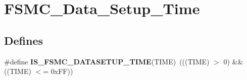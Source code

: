 \hypertarget{group__FSMC__Data__Setup__Time}{
\section{FSMC\_\-Data\_\-Setup\_\-Time}
\label{group__FSMC__Data__Setup__Time}
}
\subsection*{Defines}
\begin{DoxyCompactItemize}
\item 
\hypertarget{group__FSMC__Data__Setup__Time_ga3d923de775489e844913b29e77e8cca7}{
\#define {\bfseries IS\_\-FSMC\_\-DATASETUP\_\-TIME}(TIME)~(((TIME) $>$ 0) \&\& ((TIME) $<$= 0xFF))}
\label{group__FSMC__Data__Setup__Time_ga3d923de775489e844913b29e77e8cca7}

\end{DoxyCompactItemize}
